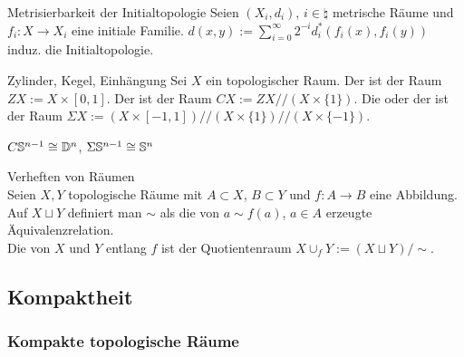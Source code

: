\begin{Satz}{Metrisierbarkeit der Initialtopologie}
    Seien $(X_i, d_i)$, $i \in \natural$ metrische Räume und \\
    $f_i\colon X \rightarrow X_i$ eine initiale Familie.
    $d(x, y) := \sum_{i=0}^\infty 2^{-i} d_i^\ast(f_i(x), f_i(y))$ induz.
    die Initialtopologie.
\end{Satz}

\linie

\begin{Def}{Zylinder, Kegel, Einhängung}
    Sei $X$ ein topologischer Raum.
    Der  ist der Raum $ZX := X \times [0,1]$.
    Der  ist der Raum
    $CX := ZX/\!/(X \times \{1\})$.
    Die  oder der  ist der Raum
    $\Sigma X := (X \times [-1,1])/\!/(X \times \{1\})/\!/(X \times \{-1\})$.
\end{Def}

\begin{Bsp}
    $C \mathbb{S}^{n-1} \cong \mathbb{D}^n$,
    $\Sigma \mathbb{S}^{n-1} \cong \mathbb{S}^n$
\end{Bsp}

\begin{Def}{Verheften von Räumen}\\
    Seien $X, Y$ topologische Räume  mit $A \subset X$, $B \subset Y$ und
    $f\colon A \rightarrow B$ eine Abbildung. \\
    Auf $X \sqcup Y$ definiert man $\sim$ als die von $a \sim f(a)$, $a \in A$
    erzeugte Äquivalenzrelation. \\
    Die  von $X$ und $Y$ entlang $f$ ist der Quotientenraum
    $X \cup_f Y := (X \sqcup Y)/\sim$.
\end{Def}

\pagebreak

\subsection{%
    Kompaktheit%
}

\subsubsection{%
    Kompakte topologische Räume%
}

